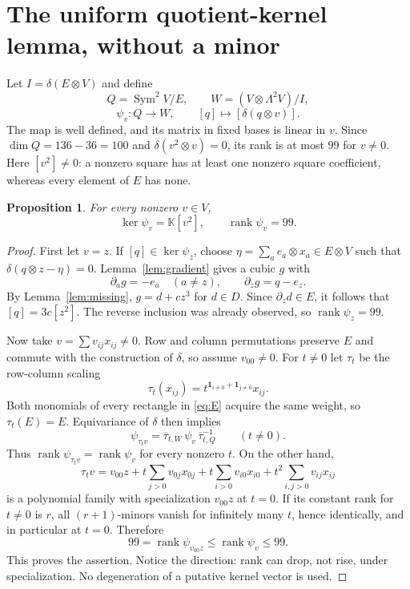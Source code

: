 \documentclass[11pt]{article}
\newtheorem{proposition}[theorem]{Proposition}
\theoremstyle{remark}
\newcommand{\kk}{\mathbb K}
\newcommand{\Sym}{\operatorname{Sym}}
\newcommand{\rank}{\operatorname{rank}}
\newcommand{\dd}{\partial}
\begin{document}
\section{The uniform quotient-kernel lemma, without a minor}
Let $I=\delta(E\otimes V)$ and define
\[
 Q=\Sym^2V/E,\qquad W=(V\otimes\Lambda^2V)/I,
\]
\[
 \psi_v:Q\longrightarrow W,\qquad [q]\longmapsto[\delta(q\otimes v)].
\]
The map is well defined, and its matrix in fixed bases is linear in $v$.
Since $\dim Q=136-36=100$ and $\delta(v^2\otimes v)=0$, its rank is at
most $99$ for $v\ne0$. Here $[v^2]\ne0$: a nonzero square has at least
one nonzero square coefficient, whereas every element of $E$ has none.

\begin{proposition}\label{prop:uniform}
For every nonzero $v\in V$,
\[
 \ker\psi_v=\kk[v^2],\qquad \rank\psi_v=99.
\]
\end{proposition}
\begin{proof}
First let $v=z$. If $[q]\in\ker\psi_z$, choose
$\eta=\sum_a e_a\otimes x_a\in E\otimes V$ such that
$\delta(q\otimes z-\eta)=0$. Lemma~\ref{lem:gradient} gives a cubic $g$
with
\[
 \dd_a g=-e_a\quad(a\ne z),\qquad \dd_zg=q-e_z.
\]
By Lemma~\ref{lem:missing}, $g=d+cz^3$ for $d\in D$. Since
$\dd_z d\in E$, it follows that $[q]=3c[z^2]$. The reverse inclusion
was already observed, so $\rank\psi_z=99$.

Now take $v=\sum v_{ij}x_{ij}\ne0$. Row and column permutations preserve
$E$ and commute with the construction of $\delta$, so assume $v_{00}\ne0$.
For $t\ne0$ let $\tau_t$ be the row-column scaling
\begin{equation}\label{eq:scaling}
 \tau_t(x_{ij})=t^{\mathbf1_{i\ne0}+\mathbf1_{j\ne0}}x_{ij}.
\end{equation}
Both monomials of every rectangle in \eqref{eq:E} acquire the same weight,
so $\tau_t(E)=E$. Equivariance of $\delta$ then implies
\[
 \psi_{\tau_tv}=\overline\tau_{t,W}\,\psi_v\,
                 \overline\tau_{t,Q}^{-1}\qquad(t\ne0).
\]
Thus $\rank\psi_{\tau_tv}=\rank\psi_v$ for every nonzero $t$.
On the other hand,
\[
 \tau_tv=v_{00}z+t\sum_{j>0}v_{0j}x_{0j}
                  +t\sum_{i>0}v_{i0}x_{i0}
                  +t^2\sum_{i,j>0}v_{ij}x_{ij}
\]
is a polynomial family with specialization $v_{00}z$ at $t=0$.
If its constant rank for $t\ne0$ is $r$, all $(r+1)$-minors vanish for
infinitely many $t$, hence identically, and in particular at $t=0$.
Therefore
\[
 99=\rank\psi_{v_{00}z}\leq\rank\psi_v\leq99.
\]
This proves the assertion. Notice the direction: rank can drop, not rise,
under specialization. No degeneration of a putative kernel vector is used.
\end{proof}
\end{document}
